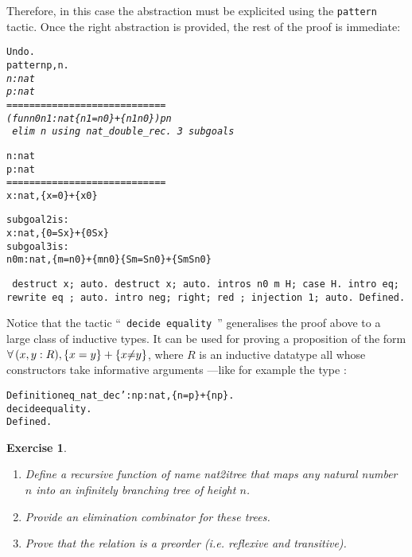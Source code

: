 \documentclass[11pt]{article}
\newcommand{\refmancite}[1]{{}}
\newtheorem{exercise}{Exercise}[section]
\begin{document}

 



Therefore,
in this case the abstraction must be explicited using the 
\texttt{pattern} tactic. Once the right abstraction is provided, the rest of
the proof is immediate:

\begin{alltt}
Undo.
 pattern p,n.
\it
  n : nat
  p : nat
  ============================
   (fun n0 n1 : nat {\funarrow} \{n1 = n0\} + \{n1 {\coqdiff} n0\}) p n
\tt
 elim n using nat_double_rec.
\it
3 subgoals
  
  n : nat
  p : nat
  ============================
   {\prodsym} x : nat, \{x = 0\} + \{x {\coqdiff} 0\}

subgoal 2 is:
 {\prodsym} x : nat, \{0 = S x\} + \{0 {\coqdiff} S x\}
subgoal 3 is:
 {\prodsym} n0 m : nat, \{m = n0\} + \{m {\coqdiff} n0\} {\arrow} \{S m = S n0\} + \{S m {\coqdiff} S n0\}

\tt
 destruct x; auto.
 destruct x; auto.
 intros n0 m H; case H.
 intro eq; rewrite eq ; auto.
 intro neg; right; red ; injection 1; auto.
Defined.
\end{alltt}


Notice that the tactic ``~\texttt{decide equality}~''
\refmancite{Section\ref{DecideEquality}} generalises the proof
above to a large class of inductive types.  It can be used for proving
a proposition of the form 
$\forall\,(x,y:R),\{x=y\}+\{x{\mbox{$\neq$}}y\}$, where $R$ is an inductive datatype
all whose constructors take informative arguments ---like for example
the type {\nat}:

\begin{alltt}
Definition eq_nat_dec' : {\prodsym} n p:nat, \{n=p\} + \{n{\coqdiff}p\}.
 decide equality.
Defined.
\end{alltt}

\begin{exercise}
\begin{enumerate}
\item Define a recursive  function of name \emph{nat2itree}
that maps any natural number $n$ into an infinitely branching
tree of height $n$.
\item Provide an elimination combinator for these trees.
\item Prove that the relation  is a preorder 
(i.e. reflexive and transitive).
\end{enumerate}
\end{exercise}
\end{document}
